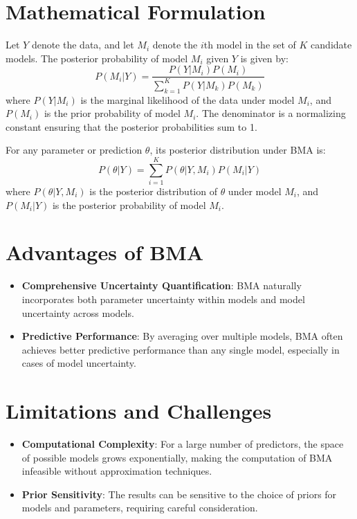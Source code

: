 \documentclass{article}
\begin{document}
\section*{Mathematical Formulation}

Let \(Y\) denote the data, and let \(M_i\) denote the \(i\)th model in the set of \(K\) candidate models. The posterior probability of model \(M_i\) given \(Y\) is given by:
\[
P(M_i | Y) = \frac{P(Y | M_i)P(M_i)}{\sum_{k=1}^K P(Y | M_k)P(M_k)}
\]
where \(P(Y | M_i)\) is the marginal likelihood of the data under model \(M_i\), and \(P(M_i)\) is the prior probability of model \(M_i\). The denominator is a normalizing constant ensuring that the posterior probabilities sum to 1.

For any parameter or prediction \(\theta\), its posterior distribution under BMA is:
\[
P(\theta | Y) = \sum_{i=1}^K P(\theta | Y, M_i)P(M_i | Y)
\]
where \(P(\theta | Y, M_i)\) is the posterior distribution of \(\theta\) under model \(M_i\), and \(P(M_i | Y)\) is the posterior probability of model \(M_i\).

\section*{Advantages of BMA}

\begin{itemize}
    \item \textbf{Comprehensive Uncertainty Quantification}: BMA naturally incorporates both parameter uncertainty within models and model uncertainty across models.
    \item \textbf{Predictive Performance}: By averaging over multiple models, BMA often achieves better predictive performance than any single model, especially in cases of model uncertainty.
\end{itemize}

\section*{Limitations and Challenges}

\begin{itemize}
    \item \textbf{Computational Complexity}: For a large number of predictors, the space of possible models grows exponentially, making the computation of BMA infeasible without approximation techniques.
    \item \textbf{Prior Sensitivity}: The results can be sensitive to the choice of priors for models and parameters, requiring careful consideration.
\end{itemize}
\end{document}
